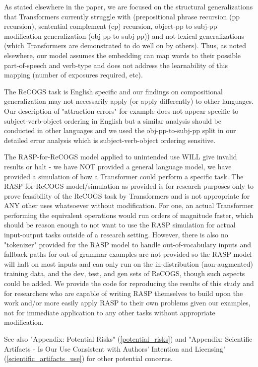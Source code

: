 \documentclass[11pt]{article}
\begin{document}
As stated elsewhere in the paper, we are focused on the structural generalizations that Transformers currently struggle with (prepositional phrase recursion (pp recursion), sentential complement (cp) recursion, object-pp to subj-pp modification generalization (obj-pp-to-subj-pp)) and not lexical generalizations (which Transformers are demonstrated to do well on by others). Thus, as noted elsewhere, our model assumes the embedding can map words to their possible part-of-speech and verb-type and does not address the learnability of this mapping (number of exposures required, etc).

The ReCOGS task is English specific and our findings on compositional generalization may not necessarily apply (or apply differently) to other languages. Our description of "attraction errors" for example does not appear specific to subject-verb-object ordering in English but a similar analysis should be conducted in other languages and we used the obj-pp-to-subj-pp split in our detailed error analysis which is subject-verb-object ordering sensitive.

The RASP-for-ReCOGS model applied to unintended use WILL give invalid results or halt - we have NOT provided a general language model, we have provided a simulation of how a Transformer could perform a specific task.
The RASP-for-ReCOGS model/simulation as provided is for research purposes only to prove feasibility of the ReCOGS task by Transformers and is not appropriate for ANY other uses whatsoever without modification. For one, an actual Transformer performing the equivalent operations would run orders of magnitude faster, which should be reason enough to not want to use the RASP simulation for actual input-output tasks outside of a research setting. However, there is also no "tokenizer" provided for the RASP model to handle out-of-vocabulary inputs and fallback paths for out-of-grammar examples are not provided so the RASP model will halt on most inputs and can only run on the in-distribution (non-augmented) training data, and the dev, test, and gen sets of ReCOGS, though such aspects could be added. We provide the code for reproducing the results of this study and for researchers who are capable of writing RASP themselves to build upon the work and/or more easily apply RASP to their own problems given our examples, not for immediate application to any other tasks without appropriate modification.

See also "Appendix: Potential Risks" (\ref{potential_risks}) and "Appendix: Scientific Artifacts - Is Our Use Consistent with Authors' Intention and Licensing" (\ref{scientific_artifacts_use}) for other potential concerns.
\end{document}

